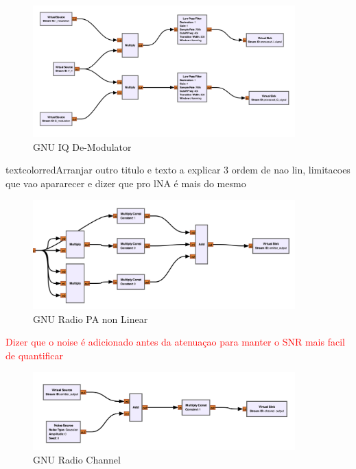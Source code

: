 \begin{figure}[H]
    \centering
    \includegraphics*[width=0.9\textwidth]{Images/GNU_Digital_IQDemod.png}
    \caption{GNU IQ De-Modulator}
    \label{fig:GNU_IQDemod}
\end{figure}

textcolor{red}{Arranjar outro titulo e texto a explicar 3 ordem de nao lin, limitacoes que vao apararecer e dizer que pro lNA é mais do mesmo}

\begin{figure}[H]
    \centering
    \includegraphics*[width=0.9\textwidth]{Images/PA_non_lin.png}
    \caption{GNU Radio PA non Linear}
    \label{fig:PA_non_lin}
\end{figure}

\textcolor{red}{Dizer que o noise é adicionado antes da atenuaçao para manter o SNR mais facil de quantificar}
\begin{figure}[H]
    \centering
    \includegraphics*[width=0.9\textwidth]{Images/GNU_Channel.png}
    \caption{GNU Radio Channel}
    \label{fig:Gnu_Channel}
\end{figure}


